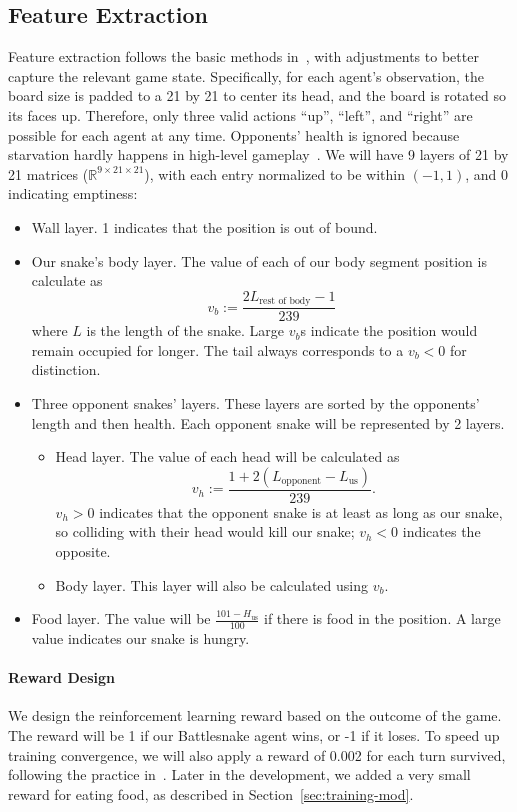 \documentclass[conference]{IEEEtran}
\begin{document}
\subsection{Feature Extraction}

Feature extraction follows the basic methods
in~\cite{siddiqui2020multiagent,archinukmonte},
with adjustments to better capture the relevant game state. Specifically,
for each agent's observation,
the board size is padded to a 21 by 21 to center its head,
and the board is rotated so its faces up. Therefore,
only three valid actions ``up'', ``left'',
and ``right'' are possible for each agent at any time.
Opponents' health is ignored because starvation hardly happens in high-level
gameplay~\cite{siddiqui2020multiagent}.
We will have 9 layers of 21 by 21 matrices ($\mathbb R^{9\times21\times21}$),
with each entry normalized to be within $(-1,1)$, and 0 indicating emptiness:
\begin{itemize}
    \item Wall layer. 1 indicates that the position is out of bound.
    \item Our snake's body layer.
    The value of each of our body segment position is calculate as $$
        v_b:=\frac{2L_{\text{rest of body}}-1}{239}
    $$ where $L$ is the length of the snake.
    Large $v_b$s indicate the position would remain occupied for longer.
    The tail always corresponds to a $v_b<0$ for distinction.
    \item Three opponent snakes' layers.
    These layers are sorted by the opponents' length and then health.
    Each opponent snake will be represented by 2 layers. \begin{itemize}
        \item Head layer. The value of each head will be calculated as $$
            v_h:=\frac{1+2(L_{\text{opponent}}-L_{\text{us}})}{239}.
        $$ $v_h>0$ indicates that the opponent snake is at least as
        long as our snake,
        so colliding with their head would kill our snake;
        $v_h<0$ indicates the opposite.
        \item Body layer. This layer will also be calculated using $v_b$.
    \end{itemize}
    \item Food layer.
    The value will be $\displaystyle\frac{101-H_{\text{us}}}{100}$ if
    there is food in the position.
    A large value indicates our snake is hungry.
\end{itemize}

\paragraph{Reward Design}
We design the reinforcement learning reward based on the outcome of the game.
The reward will be 1 if our Battlesnake agent wins, or -1 if it loses.
To speed up training convergence,
we will also apply a reward of 0.002 for each turn survived,
following the practice in~\cite{chung2020battlesnake}.
Later in the development, we added a very small reward for eating food,
as described in Section~\ref{sec:training-mod}.
\end{document}
